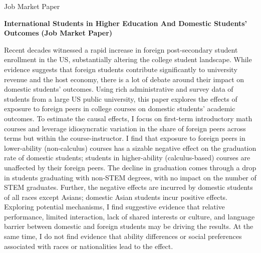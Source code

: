 \documentclass{resume} %
\begin{document}
\begin{rSection}{Job Market Paper}
	\vspace{.2em}
	
	{\bf {\color{dark}International Students in Higher Education And Domestic Students' Outcomes}} {\bf (Job Market Paper)}
	
	
	Recent decades witnessed a rapid increase in foreign post-secondary student enrollment in the US, substantially altering the college student landscape. While evidence suggests that foreign students contribute significantly to university revenue and the host economy, there is a lot of debate around their impact on domestic students' outcomes. Using rich administrative and survey data of students from a large US public university, this paper explores the effects of exposure to foreign peers in college courses on domestic students' academic outcomes. To estimate the causal effects, I focus on first-term introductory math courses and leverage idiosyncratic variation in the share of foreign peers across terms but within the course-instructor. I find that exposure to foreign peers in lower-ability (non-calculus) courses has a sizable negative effect on the graduation rate of domestic students; students in higher-ability (calculus-based) courses are unaffected by their foreign peers. The decline in graduation comes through a drop in students graduating with non-STEM degrees, with no impact on the number of STEM graduates. Further, the negative effects are incurred by domestic students of all races except Asians; domestic Asian students incur positive effects. Exploring potential mechanisms, I find suggestive evidence that relative performance, limited interaction, lack of shared interests or culture, and language barrier between domestic and foreign students may be driving the results. At the same time, I do not find evidence that ability differences or social preferences associated with races or nationalities lead to the effect. 
	
	\vspace{.5em}
\end{rSection}
\end{document}
